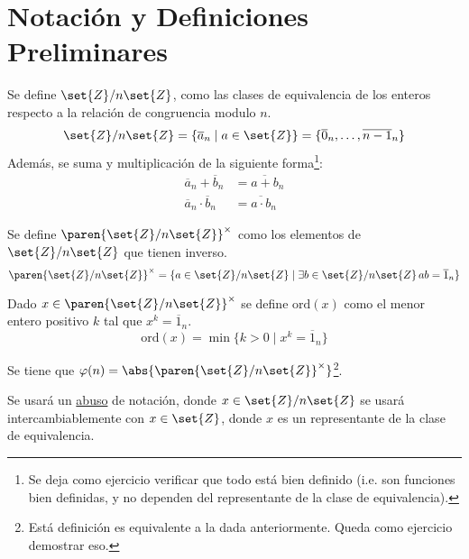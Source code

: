 \documentclass{ayudantia}
\begin{document}
\section{Notación y Definiciones Preliminares}
\begin{defn}
    Se define \(\set{Z}/n\set{Z}\), como las clases de equivalencia de los enteros respecto a la relación de congruencia modulo \(n\).
    \begin{equation*}
        \set{Z}/n\set{Z}=\{\overline{a}_n\mid a\in\set{Z}\}=\{\overline{0}_n,\ldots,\overline{n-1}_n\}
    \end{equation*}
    Además, se suma y multiplicación de la siguiente forma\footnote{Se deja como ejercicio verificar que todo está bien definido (i.e. son funciones bien definidas, y no dependen del representante de la clase de equivalencia).}:
    \begin{align*}
        \overline{a}_n+\overline{b}_n&=\overline{a+b}_n\\
        \overline{a}_n\cdot\overline{b}_n&=\overline{a\cdot b}_n
    \end{align*}
\end{defn}
\begin{defn}
    Se define \(\paren{\set{Z}/n\set{Z}}^\times\) como los elementos de \(\set{Z}/n\set{Z}\) que tienen inverso.
    \begin{equation*}
        \paren{\set{Z}/n\set{Z}}^\times=\{a\in\set{Z}/n\set{Z}\mid \exists b\in\set{Z}/n\set{Z}\, ab=\overline{1}_n\}
    \end{equation*}
\end{defn}
\begin{defn}[Orden]
    Dado \(x\in\paren{\set{Z}/n\set{Z}}^\times\) se define \(\text{ord}(x)\) como el menor entero positivo \(k\) tal que \(x^k=\overline{1}_n\).
    \begin{equation*}
        \text{ord}(x)=\min\{k>0\mid x^k=\overline{1}_n\} 
    \end{equation*} 
\end{defn}
\begin{defn}
    Se tiene que \(\varphi(n)=\abs{\paren{\set{Z}/n\set{Z}}^\times}\)\footnote{Está definición es equivalente a la dada anteriormente. Queda como ejercicio demostrar eso.}.
\end{defn}
\begin{remark}
    Se usará un \underline{abuso} de notación, donde \(x\in\set{Z}/n\set{Z}\) se usará intercambiablemente con \(x\in\set{Z}\), donde \(x\) es un representante de la clase de equivalencia.
\end{remark}
\end{document}
